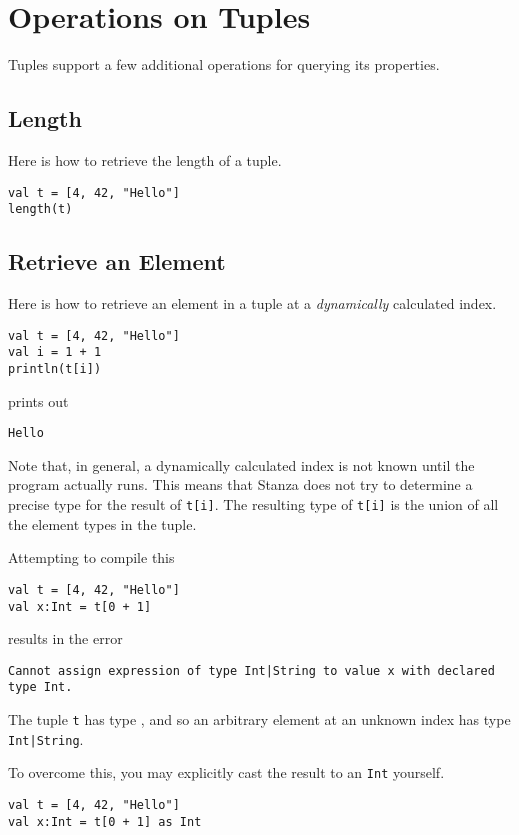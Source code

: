 \documentclass[10pt,oneside]{book}
\begin{document}
\section{Operations on Tuples}
Tuples support a few additional operations for querying its properties.

\subsection*{Length}
Here is how to retrieve the length of a tuple.
\begin{lstlisting}
val t = [4, 42, "Hello"]
length(t)
\end{lstlisting}

\subsection*{Retrieve an Element}
Here is how to retrieve an element in a tuple at a {\em dynamically} calculated index.
\begin{lstlisting}
val t = [4, 42, "Hello"]
val i = 1 + 1
println(t[i])
\end{lstlisting}
prints out
\begin{lstlisting}
Hello
\end{lstlisting}

Note that, in general, a dynamically calculated index is not known until the program actually runs. This means that Stanza does not try to determine a precise type for the result of \texttt{\frenchspacing t[i]}. The resulting type of \texttt{\frenchspacing t[i]} is the union of all the element types in the tuple.

Attempting to compile this
\begin{lstlisting}
val t = [4, 42, "Hello"]
val x:Int = t[0 + 1]
\end{lstlisting}
results in the error
\begin{lstlisting}
Cannot assign expression of type Int|String to value x with declared type Int.
\end{lstlisting}
The tuple \texttt{\frenchspacing t} has type \texttt{}, and so an arbitrary element at an unknown index has type \texttt{\frenchspacing Int|String}. 

To overcome this, you may explicitly cast the result to an \texttt{\frenchspacing Int} yourself. 
\begin{lstlisting}
val t = [4, 42, "Hello"]
val x:Int = t[0 + 1] as Int
\end{lstlisting}
\end{document}
